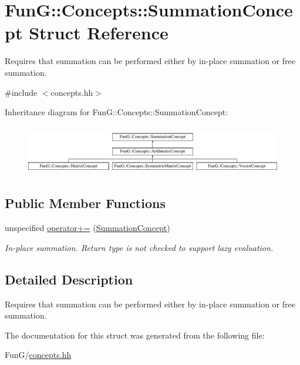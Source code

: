 \hypertarget{structFunG_1_1Concepts_1_1SummationConcept}{\section{Fun\-G\-:\-:Concepts\-:\-:Summation\-Concept Struct Reference}
\label{structFunG_1_1Concepts_1_1SummationConcept}
}


Requires that summation can be performed either by in-\/place summation or free summation.  




{\ttfamily \#include $<$concepts.\-hh$>$}

Inheritance diagram for Fun\-G\-:\-:Concepts\-:\-:Summation\-Concept\-:\begin{figure}[H]
\begin{center}
\leavevmode
\includegraphics[height=2.187500cm]{structFunG_1_1Concepts_1_1SummationConcept}
\end{center}
\end{figure}
\subsection*{Public Member Functions}
\begin{DoxyCompactItemize}
\item 
\hypertarget{structFunG_1_1Concepts_1_1SummationConcept_aa8214ca88fddf74e3bc9e7dbfe2b606f}{unspecified \hyperlink{structFunG_1_1Concepts_1_1SummationConcept_aa8214ca88fddf74e3bc9e7dbfe2b606f}{operator+=} (\hyperlink{structFunG_1_1Concepts_1_1SummationConcept}{Summation\-Concept})}\label{structFunG_1_1Concepts_1_1SummationConcept_aa8214ca88fddf74e3bc9e7dbfe2b606f}

\begin{DoxyCompactList}\small\item\em In-\/place summation. Return type is not checked to support lazy evaluation. \end{DoxyCompactList}\end{DoxyCompactItemize}


\subsection{Detailed Description}
Requires that summation can be performed either by in-\/place summation or free summation. 

The documentation for this struct was generated from the following file\-:\begin{DoxyCompactItemize}
\item 
Fun\-G/\hyperlink{concepts_8hh}{concepts.\-hh}\end{DoxyCompactItemize}
